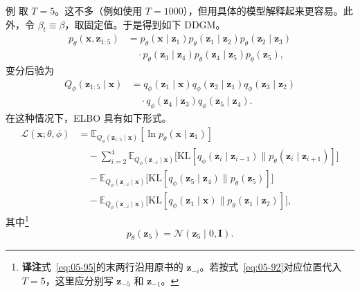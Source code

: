 \begin{booknote}{例}
取 $T=5$。这不多（例如使用 $T=1000$），但用具体的模型解释起来更容易。此外，令 $\beta_t\equiv\beta$，取固定值。于是得到如下 DDGM。
\begin{equation}
\begin{aligned}
p_\theta(\mathbf{x},\mathbf{z}_{1:5})
 &=p_\theta(\mathbf{x}\mid\mathbf{z}_1)p_\theta(\mathbf{z}_1\mid\mathbf{z}_2)p_\theta(\mathbf{z}_2\mid\mathbf{z}_3)\\
 &\quad{}\cdot p_\theta(\mathbf{z}_3\mid\mathbf{z}_4)p_\theta(\mathbf{z}_4\mid\mathbf{z}_5)p_\theta(\mathbf{z}_5),
\end{aligned}
\tag{5.93}\label{eq:05-93}
\end{equation}
变分后验为
\begin{equation}
\begin{aligned}
Q_\phi(\mathbf{z}_{1:5}\mid\mathbf{x})
 &=q_\phi(\mathbf{z}_1\mid\mathbf{x})q_\phi(\mathbf{z}_2\mid\mathbf{z}_1)q_\phi(\mathbf{z}_3\mid\mathbf{z}_2)\\
 &\quad{}\cdot q_\phi(\mathbf{z}_4\mid\mathbf{z}_3)q_\phi(\mathbf{z}_5\mid\mathbf{z}_4).
\end{aligned}
\tag{5.94}\label{eq:05-94}
\end{equation}
在这种情况下，ELBO 具有如下形式。
\begin{equation}
\begin{aligned}
\mathcal{L}(\mathbf{x};\theta,\phi)
 &=\mathbb{E}_{Q_\phi(\mathbf{z}_{1:5}\mid\mathbf{x})}[\ln p_\theta(\mathbf{x}\mid\mathbf{z}_1)]\\
 &\quad-\sum_{i=2}^4\mathbb{E}_{Q_\phi(\mathbf{z}_{-i}\mid\mathbf{x})}
       \bigl[\mathrm{KL}[q_\phi(\mathbf{z}_i\mid\mathbf{z}_{i-1})\|p_\theta(\mathbf{z}_i\mid\mathbf{z}_{i+1})]\bigr]\\
 &\quad-\mathbb{E}_{Q_\phi(\mathbf{z}_{-i}\mid\mathbf{x})}
       \bigl[\mathrm{KL}[q_\phi(\mathbf{z}_5\mid\mathbf{z}_4)\|p_\theta(\mathbf{z}_5)]\bigr]\\
 &\quad-\mathbb{E}_{Q_\phi(\mathbf{z}_{-i}\mid\mathbf{x})}
       \bigl[\mathrm{KL}[q_\phi(\mathbf{z}_1\mid\mathbf{x})\|p_\theta(\mathbf{z}_1\mid\mathbf{z}_2)]\bigr],
\end{aligned}
\tag{5.95}\label{eq:05-95}
\end{equation}
其中\footnote{\textbf{译注}\quad 式~\eqref{eq:05-95}的末两行沿用原书的 $\mathbf{z}_{-i}$。若按式~\eqref{eq:05-92}对应位置代入 $T=5$，这里应分别写 $\mathbf{z}_{-5}$ 和 $\mathbf{z}_{-1}$。}
\begin{equation}
p_\theta(\mathbf{z}_5)=\mathcal{N}(\mathbf{z}_5\mid 0,\mathbf{I}).

\end{equation}
\end{booknote}
